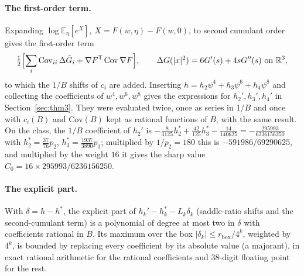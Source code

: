 \documentclass[11pt,a4paper]{article}
\theoremstyle{definition}
\theoremstyle{remark}
\newcommand{\E}{\mathbb{E}}
\newcommand{\R}{\mathbb{R}}
\begin{document}
\paragraph{The first-order term.}
Expanding $\log\E_\eta[e^{X}]$, $X=F(w,\eta)-F(w,0)$, to second cumulant order gives the first-order term
\[
\tfrac12\Bigl[\sum_i\mathrm{Cov}_{ii}\,\Delta\tilde G_i+\nabla F^{\mathsf T}\,\mathrm{Cov}\,\nabla F\Bigr],\qquad \Delta G(|x|^2)=6G'(s)+4sG''(s)\ \text{on }\R^3,
\]
to which the $1/B$ shifts of $c_i$ are added.
Inserting $h=h_2\psi^4+h_3\psi^6+h_4\psi^8$ and collecting the coefficients of $w^4,w^6,w^8$ gives the expressions for $h_2',h_3',h_4'$ in Section~\ref{sec:thm3}.
They were evaluated twice, once as series in $1/B$ and once with $c_i(B)$ and $\mathrm{Cov}(B)$ kept as rational functions of $B$, with the same result.
On the class, the $1/B$ coefficient of $h_2'$ is $-\tfrac8{3125}h_2^*+\tfrac{42}{125}h_3^*-\tfrac{14}{140625}=-\tfrac{295993}{6236156250}$ with $h_2^*=\tfrac{37}{76}p_2$, $h_3^*=\tfrac{1937}{3890}p_3$; multiplied by $1/p_2=180$ this is $-591986/69290625$, and multiplied by the weight $16$ it gives the sharp value $C_0=16\times295993/6236156250$.

\paragraph{The explicit part.}
With $\delta=h-h^*$, the explicit part of $h_k'-h_k^*-L_k\delta_k$ (saddle-ratio shifts and the second-cumulant term) is a polynomial of degree at most two in $\delta$ with coefficients rational in $B$.
Its maximum over the box $|\delta_k|\le r_{\mathrm{box}}/4^k$, weighted by $4^k$, is bounded by replacing every coefficient by its absolute value (a majorant), in exact rational arithmetic for the rational coefficients and $38$-digit floating point for the rest.
\end{document}
